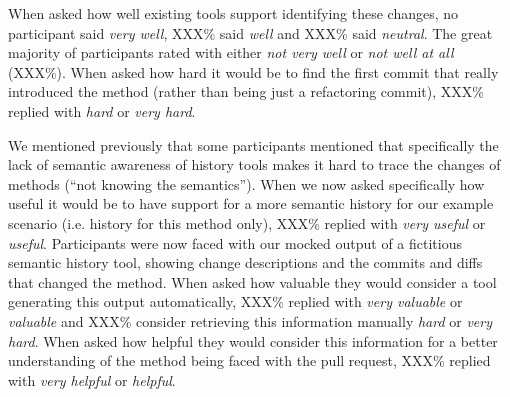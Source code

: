
When asked how well existing tools support identifying these changes, no participant said \textit{very well}, XXX\% said \textit{well} and XXX\% said \textit{neutral}. The great majority of participants rated with either \textit{not very well} or \textit{not well at all} (XXX\%). When asked how hard it would be to find the first commit that really introduced the method (rather than being just a refactoring commit), XXX\% replied with \textit{hard} or \textit{very hard}. 




\noindent
We mentioned previously that some participants mentioned that specifically the lack of semantic awareness of history tools makes it hard to trace the changes of methods (``not knowing the semantics''). When we now asked specifically how useful it would be to have support for a more semantic history for our example scenario  (i.e. history for this method only), XXX\% replied with \textit{very useful} or \textit{useful}. Participants were now faced with our mocked output of a fictitious semantic history tool, showing change descriptions and the commits and diffs that changed the method. When asked how valuable they would consider a tool generating this output automatically, XXX\% replied with \textit{very valuable} or \textit{valuable} and XXX\% consider retrieving this information manually \textit{hard} or \textit{very hard}. When asked how helpful they would consider this information for a better understanding of the method being faced with the pull request, XXX\% replied with \textit{very helpful} or \textit{helpful}. 


